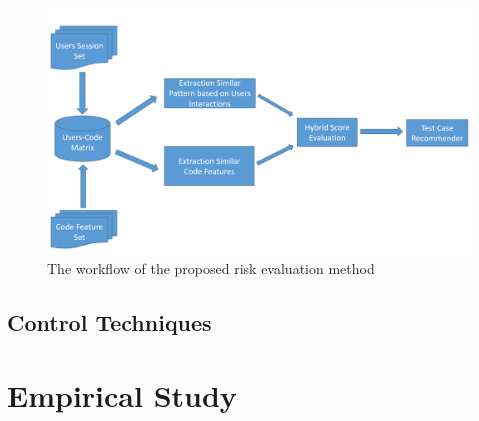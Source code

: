\begin{figure}[t]
	\centering
	\includegraphics[width=0.90\linewidth]{./Overview.png}
	\vspace*{3pt}
	\caption{The workflow of the proposed risk evaluation method}
	\label{fig:workflow}
\end{figure}


\subsection{Control Techniques}





\vspace*{4pt}
\section{Empirical Study}
\label{sec:study}



\noindent




